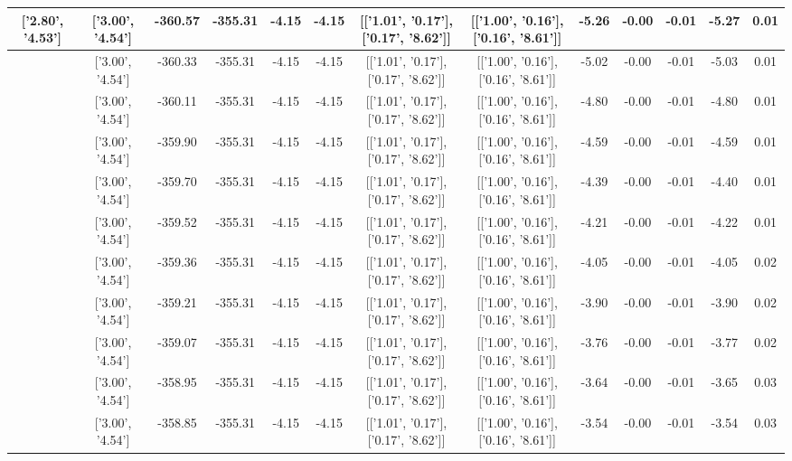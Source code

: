 \begin{table}[htbp]
\begin{adjustbox}{angle=90}
\begin{tabular}{|c|c|c|c|c|c|c|c|c|c|c|c|c|}
 ['2.80', '4.53'] & ['3.00', '4.54'] & -360.57 & -355.31 & -4.15 & -4.15 & [['1.01', '0.17'], ['0.17', '8.62']] & [['1.00', '0.16'], ['0.16', '8.61']] & -5.26 & -0.00 & -0.01 & -5.27 & 0.01\\ \hline
 ['2.81', '4.53'] & ['3.00', '4.54'] & -360.33 & -355.31 & -4.15 & -4.15 & [['1.01', '0.17'], ['0.17', '8.62']] & [['1.00', '0.16'], ['0.16', '8.61']] & -5.02 & -0.00 & -0.01 & -5.03 & 0.01\\ \hline
 ['2.82', '4.53'] & ['3.00', '4.54'] & -360.11 & -355.31 & -4.15 & -4.15 & [['1.01', '0.17'], ['0.17', '8.62']] & [['1.00', '0.16'], ['0.16', '8.61']] & -4.80 & -0.00 & -0.01 & -4.80 & 0.01\\ \hline
 ['2.84', '4.53'] & ['3.00', '4.54'] & -359.90 & -355.31 & -4.15 & -4.15 & [['1.01', '0.17'], ['0.17', '8.62']] & [['1.00', '0.16'], ['0.16', '8.61']] & -4.59 & -0.00 & -0.01 & -4.59 & 0.01\\ \hline
 ['2.85', '4.53'] & ['3.00', '4.54'] & -359.70 & -355.31 & -4.15 & -4.15 & [['1.01', '0.17'], ['0.17', '8.62']] & [['1.00', '0.16'], ['0.16', '8.61']] & -4.39 & -0.00 & -0.01 & -4.40 & 0.01\\ \hline
 ['2.86', '4.53'] & ['3.00', '4.54'] & -359.52 & -355.31 & -4.15 & -4.15 & [['1.01', '0.17'], ['0.17', '8.62']] & [['1.00', '0.16'], ['0.16', '8.61']] & -4.21 & -0.00 & -0.01 & -4.22 & 0.01\\ \hline
 ['2.87', '4.53'] & ['3.00', '4.54'] & -359.36 & -355.31 & -4.15 & -4.15 & [['1.01', '0.17'], ['0.17', '8.62']] & [['1.00', '0.16'], ['0.16', '8.61']] & -4.05 & -0.00 & -0.01 & -4.05 & 0.02\\ \hline
 ['2.88', '4.53'] & ['3.00', '4.54'] & -359.21 & -355.31 & -4.15 & -4.15 & [['1.01', '0.17'], ['0.17', '8.62']] & [['1.00', '0.16'], ['0.16', '8.61']] & -3.90 & -0.00 & -0.01 & -3.90 & 0.02\\ \hline
 ['2.90', '4.53'] & ['3.00', '4.54'] & -359.07 & -355.31 & -4.15 & -4.15 & [['1.01', '0.17'], ['0.17', '8.62']] & [['1.00', '0.16'], ['0.16', '8.61']] & -3.76 & -0.00 & -0.01 & -3.77 & 0.02\\ \hline
 ['2.91', '4.53'] & ['3.00', '4.54'] & -358.95 & -355.31 & -4.15 & -4.15 & [['1.01', '0.17'], ['0.17', '8.62']] & [['1.00', '0.16'], ['0.16', '8.61']] & -3.64 & -0.00 & -0.01 & -3.65 & 0.03\\ \hline
 ['2.92', '4.53'] & ['3.00', '4.54'] & -358.85 & -355.31 & -4.15 & -4.15 & [['1.01', '0.17'], ['0.17', '8.62']] & [['1.00', '0.16'], ['0.16', '8.61']] & -3.54 & -0.00 & -0.01 & -3.54 & 0.03\\ \hline

\end{tabular}
\end{adjustbox}
\end{table}
